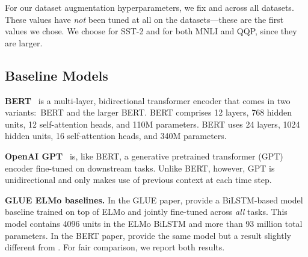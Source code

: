 \documentclass[11pt,a4paper]{article}
\newcommand{\parheader}[1]{{\smallskip \noindent \bf #1.}}
\begin{document}
For our dataset augmentation hyperparameters, we fix  and  across all datasets. These values have \textit{not} been tuned at all on the datasets---these are the first values we chose. We choose  for \mbox{SST-2} and  for both MNLI and QQP, since they are larger.


\subsection{Baseline Models}

\textbf{BERT}~\cite{devlin2018bert} is a multi-layer, bidirectional transformer encoder that comes in two variants:~BERT and the larger BERT. BERT comprises 12 layers, 768 hidden units, 12 self-attention heads, and 110M parameters. BERT uses 24 layers, 1024 hidden units, 16 self-attention heads, and 340M parameters.

\smallskip \noindent \textbf{OpenAI GPT}~\cite{radford2018improving}
is, like BERT, a generative pretrained transformer (GPT) encoder fine-tuned on downstream tasks. 
Unlike BERT, however, GPT is unidirectional and only makes use of previous context at each time step.

\parheader{GLUE ELMo baselines} 
In the GLUE paper, \citet{wang2018glue} provide a BiLSTM-based model baseline trained on top of ELMo and jointly fine-tuned across \textit{all} tasks. This model contains 4096 units in the ELMo BiLSTM and more than 93 million total parameters. In the BERT paper, \citet{devlin2018bert} provide the same model but a result slightly different from  \citet{wang2018glue}. For fair comparison, we report both results.
\end{document}
